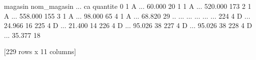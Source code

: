      magasin nom_magasin  ...       ca quantite
0          1           A  ...   60.000       20
1          1           A  ...  520.000      173
2          1           A  ...  558.000      155
3          1           A  ...   98.000       65
4          1           A  ...   68.820       29
..       ...         ...  ...      ...      ...
224        4           D  ...   24.966       16
225        4           D  ...   21.400       14
226        4           D  ...   95.026       38
227        4           D  ...   95.026       38
228        4           D  ...   35.377       18

[229 rows x 11 columns]
